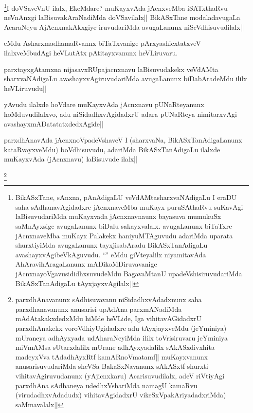 \begin{artha}
\footnote{BikASxTane, sAnxna, pAnAdigaLU veVdAMtasharxvaNAdigaLu I eraDU saha sAdhanavAgidadxre jAcnxnaveMba muKayx puruSAthaRvu suKavAgi laBisuvudariMda muKayxvada jAcnxnavnaunx bayasuva mumukuSx saMnAyxsige avugaLanunx biDalu sakayxvalalx. avugaLanunx biTaTxre jAcnxnaveMba muKayx Palakekx haniyuMTAguvudu adariMda uparata shurxtiyiMda avugaLanunx tayxjisabAradu BikASxTanAdigaLu avashayxvAgibeVkAguvudu. ``\stext" eMdu giVteyalilx niyamitavAda AhAravihAragaLanunx mADikoMDiruvavanige jAcnxnayoVgavusididhxsuvudeMdu BagavaMtanU upadeVshisiruvudariMda BikASxTanAdigaLu tAyxjayxvAgilalx||}I doVSaveVnU ilalx, EkeMdare? muKayxvAda jAcnxveMba iSATxthaRvu neVnAnxgi laBisuvakAraNadiMda doVSavilalx|| BikASxTane modaladavugaLa AcaraNeyu AjAcnxnakAkxgiye iruvudariMda avugaLanunx niSeVdhisuvudilalx||
\end{artha}

\begin{artha}
eMdu AsharxmadhamaRvannx biTaTxvanige pArxyashicxtatxveV ilalxveMbudAgi heVLutAtx pAtitayxvanunx heVLiruvaru.
\end{artha}

\begin{artha}
parxtayxgAtamxna nijasavxRUpajacnxnavu laBisuvudakekx veVdAMta sharxvaNAdigaLu avashayxvAgiruvudariMda avugaLanunx biDabAradeMdu ililx heVLiruvudu||
\end{artha}


\begin{artha}
yAvudu ilalxde hoVdare muKayxvAda jAcnxnavu pUNaRteyanunx hoMduvudilalxvo, adu niSidadhxvAgidadxrU adara pUNaRteya nimitarxvAgi avashayxmADatatatxdedxAgide||
\end{artha}


\begin{artha}
parxdhAnavAda jAcnxnoVpadeVshaveV I (sharxvaNa, BikASxTanAdigaLanunx kataRvayxveMdu) boVdhisuvudu, adariMda BikASxTanAdigaLu  ilalxde muKayxvAda (jAcnxnavu) laBisuvude ilalx||
\end{artha}

\begin{artha}
\footnote{parxdhAnavanunx sAdhisuvavanu niSidadhxvAdadxnunx saha parxdhanavanunx anusarisi upAdAna parxmANadiMda mAdAtakakxdedxMdu hiMde heVLide, Iga vihitavAGidadxrU parxdhAnakekx voroVdhiyUgidadxre adu tAyxjayxveMdu (jeYminiya) mUraneya adhAyxyada udAharaNeyiMda ililx toVrisiruvaru jeYminiya miVmAMsa sUtarxdalilx mUrane adhAyxyadalilx sAkASxdivxhita madeyxVva tAdadhAyxRtf kamARnoVmatamf|| muKayxvanunx anusarisuvudariMda sheVSa BakaSxNavanunx sAkASxtf shurxti vihitavAgiruvudanunx (yAjicnxkaru) Acarisuvudilalx, adeV riVtiyAgi parxdhAna sAdhaneya udedhxVshariMda namagU kamaRvu (virudadhxvAdadudx) vihitavAgidadxrU vikeSxVpakAriyadadxriMda) saMmavalalx||}
\end{artha}

